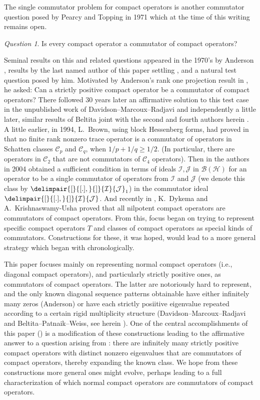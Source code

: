 \documentclass[10pt,reqno]{amsart}
\theoremstyle{remark}
\newtheorem{question}{Question}
\newcommand{\BH}{\mathcal{B}(\Hil)}
\newcommand{\Hil}{\mathcal{H}}
\newcommand{\comm}{\delimpair{[}{[.],}{]}}
\newcommand{\I}{\mathcal{I}}
\newcommand{\J}{\mathcal{J}}
\newcommand{\schatten}[1]{\mathcal{C}_{#1}}
\numberwithin{equation}{section}
\begin{document}
The single commutator problem for compact operators is another commutator question posed by Pearcy and Topping in 1971 which at the time of this writing remains open.

\begin{question}
  Is every compact operator a commutator of compact operators?
\end{question}

Seminal results on this and related questions appeared in the 1970's by Anderson \cite{And-1977-JRAM}, results by the last named author of this paper  \cite{Wei-1980-IEOT} settling \cite[Problem 3(i)]{PT-1971-MMJ}, and a natural test question posed by him.
Motivated by Anderson's rank one projection result in  \cite{And-1977-JRAM}, he asked: Can a strictly positive compact operator be a commutator of compact operators?
There followed 30 years later an affirmative solution to this test case in the unpublished work of Davidson--Marcoux--Radjavi \cite{DMR} and independently a little later, similar results of Beltita joint with the second and fourth authors herein \cite{BPW-2014-VLOT,Pat-2012}.
A little earlier, in  1994, L.~Brown, using block Hessenberg forms, had proved in \cite{Bro-1994-JRAM} that  no finite rank nonzero trace operator is a commutator of operators in Schatten classes $\schatten{p}$ and  $\schatten{q}$, when $1/p+1/q\ge 1/2$.
(In particular, there are operators in $\schatten{2}$ that are not  commutators of $\schatten{4}$ operators).
Then in  \cite[Section 7]{DFWW-2004-AM}  the authors in 2004 obtained a sufficient condition in terms of ideals $\I,\J$ in $\BH$ for an operator to be a single commutator of operators from $\I$ and $\J$ (we denote this class by $\comm{\I}{\J}_1$) in the commutator ideal $\comm{\I}{\J}$.
And recently in \cite{DK-2018-PAMS}, K.~Dykema and A.~Krishnaswamy-Usha proved that all nilpotent compact operators are commutators of compact operators.
From this, focus began on trying to represent specific compact operators $T$ and classes of compact operators as special kinds of commutators.
Constructions for these, it was hoped, would lead to a more general strategy which began with \cite{DMR,Pat-2012,BPW-2014-VLOT} chronologically.


This paper focuses mainly on representing normal compact operators (i.e., diagonal compact operators), and particularly strictly positive ones, as commutators of compact operators.
The latter are notoriously hard to represent, and the only known  diagonal sequence patterns obtainable have either infinitely many zeros (Anderson) or have each strictly posiitive eigenvalue repeated according to a certain rigid multiplicity structure (Davidson--Marcoux--Radjavi and Beltita--Patnaik--Weiss, see herein ). 
One of the central accomplishments of this paper () is
a modification of these constructions leading to the affirmative answer to a question arising from \cite[p. 9]{BPW-2014-VLOT}:
there are infinitely many strictly positive compact operators with distinct nonzero eigenvalues that are commutators of compact operators, thereby expanding the known class.
We hope from these constructions more general ones might evolve, perhaps leading to a full characterization of which normal compact operators are commutators of compact operators.
\end{document}
